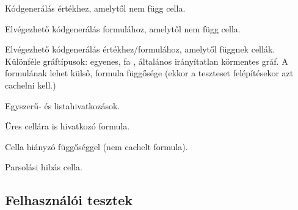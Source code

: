 \begin{compactenum}
	\item Kódgenerálás értékhez, amelytől nem függ cella.
	\item Elvégezhető kódgenerálás formulához, amelytől nem függ cella.
	\item Elvégezhető kódgenerálás értékhez/formulához, amelytől függnek cellák. Különféle gráftípusok: egyenes, fa	, általános irányítatlan körmentes gráf. A formulának lehet külső, formula függősége (ekkor a teszteset felépítésekor azt cachelni kell.)
	\item Egyszerű- és listahivatkozások.
	\item Üres cellára is hivatkozó formula.
	\item Cella hiányzó függőséggel (nem cachelt formula).
	\item Parsolási hibás cella.
\end{compactenum}

\subsection{Felhasználói tesztek}

